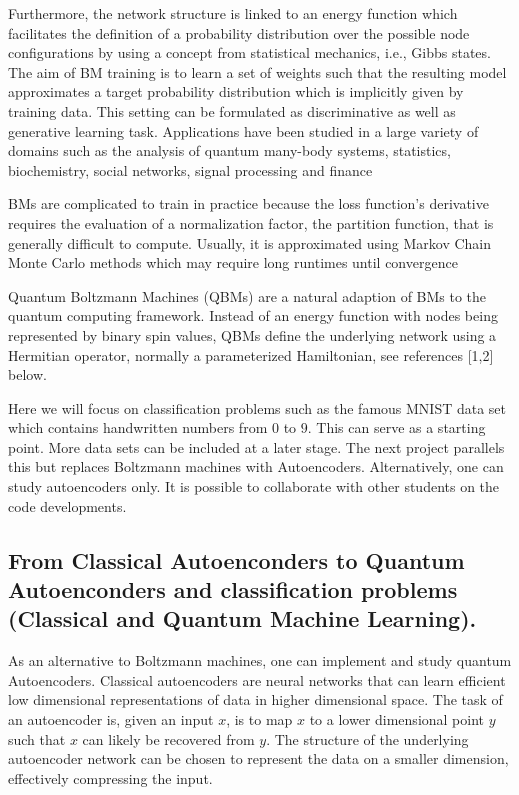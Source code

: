 \documentclass{article}
\begin{document}
Furthermore, the network structure is linked to an energy function
which facilitates the definition of a probability distribution over
the possible node configurations by using a concept from statistical
mechanics, i.e., Gibbs states.  The aim of BM training is to learn a
set of weights such that the resulting model approximates a target
probability distribution which is implicitly given by training data.
This setting can be formulated as discriminative as well as generative
learning task.  Applications have been studied in a large variety of
domains such as the analysis of quantum many-body systems, statistics,
biochemistry, social networks, signal processing and finance

BMs are complicated to train in practice because the loss
function's derivative requires the evaluation of a normalization
factor, the partition function, that is generally difficult to
compute.  Usually, it is approximated using Markov Chain Monte Carlo
methods which may require long runtimes until convergence

Quantum Boltzmann Machines (QBMs) are a natural adaption of BMs to the
quantum computing framework. Instead of an energy function with nodes
being represented by binary spin values, QBMs define the underlying
network using a Hermitian operator, normally a parameterized
Hamiltonian, see references [1,2] below.

Here we will focus on classification problems such as the famous MNIST
data set which contains handwritten numbers from $0$ to $9$.  This can
serve as a starting point.  More data sets can be included at a later
stage.  The next project parallels this but replaces Boltzmann
machines with Autoencoders. Alternatively, one can study autoencoders only. It is possible to collaborate with other students on the code developments.


\subsection*{From Classical Autoenconders to Quantum Autoenconders and classification problems (Classical and Quantum Machine Learning).}

As an alternative to Boltzmann machines, one can implement and study quantum Autoencoders.
Classical autoencoders are neural networks that can learn efficient
low dimensional representations of data in higher dimensional
space. The task of an autoencoder is, given an input $x$, is to map
$x$ to a lower dimensional point $y$ such that $x$ can likely be
recovered from $y$. The structure of the underlying autoencoder
network can be chosen to represent the data on a smaller dimension,
effectively compressing the input.
\end{document}
